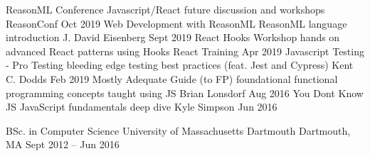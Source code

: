 \documentclass[]{awesome-cv}
\begin{document}
\begin{cvhonors}
	\cvhonor
	{ReasonML Conference}
	{Javascript/React future discussion and workshops}
	{ReasonConf}
	{Oct 2019}
	\cvhonor
	{Web Development with ReasonML}
	{ReasonML language introduction}
	{J. David Eisenberg}
	{Sept 2019}
	\cvhonor
	{React Hooks Workshop}
	{hands on advanced React patterns using Hooks}
	{React Training}
	{Apr 2019}
	\cvhonor
	{Javascript Testing - Pro Testing}
	{bleeding edge testing best practices (feat. Jest and Cypress)}
	{Kent C. Dodds}
	{Feb 2019}
	\cvhonor
	{Mostly Adequate Guide (to FP)}
	{foundational functional programming concepts taught using JS}
	{Brian Lonsdorf}
	{Aug 2016}
	\cvhonor
	{You Don\textquotesingle{}t Know JS}
	{JavaScript fundamentals deep dive}
	{Kyle Simpson}
	{Jun 2016}
\end{cvhonors}

\begin{cventries}
	\cventry
	{BSc. in Computer Science}
	{University of Massachusetts Dartmouth}
	{Dartmouth, MA}
	{Sept 2012 – Jun 2016}
	{}
\end{cventries}
\end{document}

